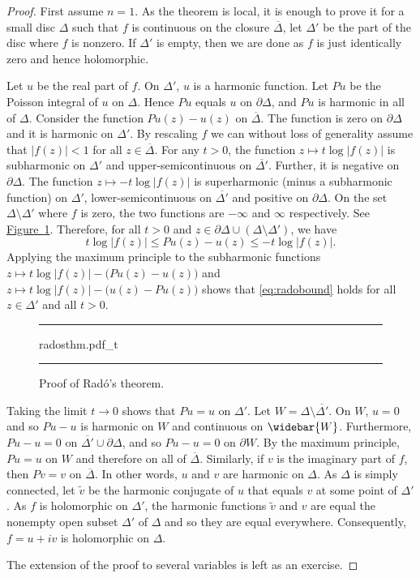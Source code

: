 \documentclass[12pt,openany]{book}
\newcommand{\abs}[1]{\left\lvert {#1} \right\rvert}
\theoremstyle{plain}
\theoremstyle{remark}
\theoremstyle{definition}
\newenvironment{myfig}{%
\begin{figure}[h!t]
\noindent\rule{\textwidth}{0.5pt}\vspace{12pt}\par\centering}%
{\par\noindent\rule{\textwidth}{0.5pt}
\end{figure}}
\theoremstyle{exercise}
\theoremstyle{example}
\newcommand{\figureref}[1]{\hyperref[#1]{Figure~\ref*{#1}}}
\begin{document}
\begin{proof}
First assume $n=1$.  As the theorem is local, it is
enough to prove it for a small disc $\Delta$ such that $f$ is continuous
on the closure $\overline{\Delta}$, let $\Delta'$ be the part of the disc
where $f$ is nonzero.  If $\Delta'$ is empty, then we are done as
$f$ is just identically zero and hence holomorphic.

Let $u$ be the real part of $f$.  On $\Delta'$, $u$ is a harmonic function.
Let $Pu$ be the Poisson integral of $u$ on $\Delta$.  Hence $Pu$
equals $u$ on $\partial \Delta$, and $Pu$ is harmonic in all of $\Delta$.
Consider the function
$Pu(z) - u(z)$ on $\overline{\Delta}$.  The function is zero
on $\partial \Delta$ and it is harmonic on $\Delta'$.  By rescaling $f$
we can without loss of generality assume that $\abs{f(z)} < 1$ for all $z
\in \overline{\Delta}$.  For any $t >0$, the function 
$z \mapsto t \log \abs{f(z)}$ is subharmonic on $\Delta'$ and
upper-semicontinuous on $\overline{\Delta'}$.  Further, it is negative
on $\partial \Delta$.  The function $z \mapsto -t \log \abs{f(z)}$ is
superharmonic (minus a subharmonic function) on $\Delta'$,
lower-semicontinuous on $\overline{\Delta'}$ and positive on $\partial
\Delta$.  On the set $\Delta \setminus \Delta'$ where $f$ is zero, the two functions are $-\infty$ and
$\infty$ respectively.
See \figureref{fig:radosthm}.
Therefore, for all $t > 0$ and 
$z \in \partial \Delta \cup (\Delta \setminus \Delta')$,
we have
\begin{equation} \label{eq:radobound}
t \log \abs{f(z)} \leq Pu(z)-u(z) \leq -t \log \abs{f(z)}  .
\end{equation}
Applying the maximum principle to the subharmonic functions
$z \mapsto t \log \abs{f(z)} - \bigl(Pu(z)-u(z)\bigr)$
and
$z \mapsto t \log \abs{f(z)} - \bigl(u(z)-Pu(z)\bigr)$
shows that 
\eqref{eq:radobound} holds for all $z \in \Delta'$ and all $t > 0$.

\begin{myfig}
{radosthm.pdf_t}
\caption{Proof of Rad\'o's theorem.\label{fig:radosthm}}
\end{myfig}


Taking the limit
$t \to 0$ shows that $Pu = u$ on $\Delta'$.
Let $W = \Delta \setminus \overline{\Delta'}$.
On $W$, $u=0$ and so $Pu-u$ is harmonic on $W$
and continuous on $\widebar{W}$.  Furthermore,
$Pu-u=0$ on $\overline{\Delta'} \cup \partial \Delta$,
and so $Pu-u=0$ on $\partial W$.  By the maximum principle, $Pu=u$ on $W$
and therefore on all of $\overline{\Delta}$.
Similarly, if $v$ is the imaginary part of $f$, then $Pv = v$ on
$\overline{\Delta}$.
In other words, $u$ and $v$ are harmonic on $\Delta$.
As $\Delta$ is simply connected,
let $\tilde{v}$ be the harmonic conjugate of $u$ that equals $v$ at
some point of $\Delta'$.  As $f$ is holomorphic on $\Delta'$,
the harmonic functions $\tilde{v}$ and $v$
are equal the nonempty open subset $\Delta'$ of $\Delta$ and so
they are equal everywhere.  Consequently, $f = u +iv$ is holomorphic on
$\Delta$.

The extension of the proof to several variables is left as an exercise.
\end{proof}
\end{document}
